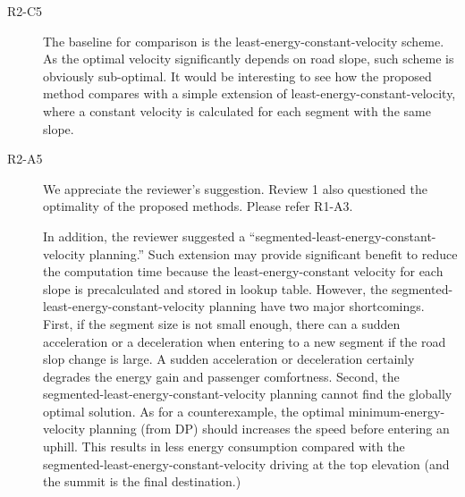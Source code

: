 \documentclass[onecolumn]{IEEEconf}
\begin{document}
\begin{description}
\item [R2-C5] The baseline for comparison is the least-energy-constant-velocity scheme. As the optimal velocity significantly depends on road slope, such scheme is obviously sub-optimal. It would be interesting to see how the proposed method compares with a simple extension of least-energy-constant-velocity, where a constant velocity is calculated for each segment with the same slope.

\item [R2-A5] We appreciate the reviewer's suggestion. Review 1 also questioned the optimality of the proposed methods. Please  refer R1-A3. 

In addition, the reviewer suggested a ``segmented-least-energy-constant-velocity planning.'' Such extension may provide significant benefit to reduce the computation time because the least-energy-constant velocity for each slope is precalculated and stored in lookup table. 
However, the segmented-least-energy-constant-velocity planning have two major shortcomings. First, if the segment size is not small enough, there can a sudden acceleration or a deceleration when entering to a new segment if the road slop change is large. A sudden acceleration or deceleration certainly degrades the energy gain and passenger comfortness. Second, the segmented-least-energy-constant-velocity planning cannot find the globally optimal solution. As for a counterexample, the optimal minimum-energy-velocity planning (from DP) should increases  the speed before entering an uphill. This results in less energy consumption compared with the segmented-least-energy-constant-velocity driving at the top elevation (and the summit is the final destination.)  


\end{description}
\end{document}
